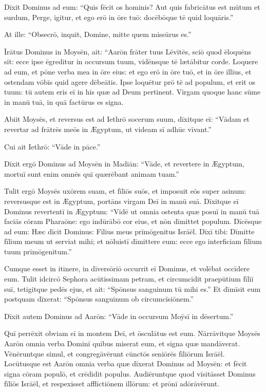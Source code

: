 Dīxit Dominus ad eum: ``Quis fēcit os hominis?
Aut quis fabricātus est mūtum et surdum,
Perge, igitur, et ego erō in ōre tuō:
docēbōque tē quid loquāris.''

At ille: ``Obsecrō, inquit, Domine,
mitte quem missūrus es.''

Īrātus Dominus in Moysēn, ait: ``Aarōn frāter tuus Lēvītēs,
sciō quod ēloquēns sit: ecce ipse ēgreditur in occursum tuum,
vidēnsque tē lætābitur corde.
Loquere ad eum, et pōne verba mea in ōre eius:
et ego erō in ōre tuō, et in ōre illīus,
et ostendam vōbīs quid agere dēbeātis.
Ipse loquētur prō tē ad populum,
et erit os tuum:
tū autem eris eī in hīs quæ ad Deum pertinent.
Virgam quoque hanc sūme in manū tuā,
in quā factūrus es signa.

Abiit Moysēs, et reversus est ad Iethrō socerum suum,
dīxitque eī: ``Vādam et revertar ad frātrēs meōs in Ægyptum,
ut videam sī adhūc vīvant.''

Cui ait Iethrō: ``Vāde in pāce.''

Dīxit ergō Dominus ad Moysēn in Madiān: ``Vāde, et revertere in Ægyptum,
mortuī sunt enim omnēs quī quærēbant animam tuam.''

Tulit ergō Moysēs uxōrem suam, et fīliōs suōs,
et imposuit eōs super asinum: reversusque est in Ægyptum,
portāns virgam Deī in manū suā. Dīxitque eī Dominus revertentī
in Ægyptum: ``Vidē ut omnia ostenta quæ posuī in manū tuā
faciās cōram Pharaōne: ego indūrābō cor eius,
et nōn dīmittet populum. Dīcēsque ad eum: Hæc
dīcit Dominus: Fīlius meus prīmōgenitus Isrāēl.
Dīxī tibi: Dīmitte fīlium meum ut serviat mihi;
et nōluistī dīmittere eum:
ecce ego interficiam fīlium tuum prīmōgenitum.''

Cumque esset in itinere, in dīversōriō
occurrit eī Dominus, et volēbat occīdere eum. 
Tulit idcircō Sephora acūtissimam petram,
et circumcīdit praepūtium fīliī suī, tetigitque pedēs ejus,
et ait: ``Spōnsus sanguinum tū mihi es.''
Et dīmīsit eum postquam dīxerat: ``Spōnsus sanguinum ob circumcīsiōnem.''

Dīxit autem Dominus ad Aarōn: ``Vāde in occursum Moȳsī
in dēsertum.'' 

Quī perrēxit obviam eī in montem Deī, et ōsculātus est eum.
Nārrāvitque Moysēs Aarōn omnia verba Dominī quibus miserat eum,
et signa quæ mandāverat. Vēnēruntque simul, et congregāvērunt
cūnctōs seniōrēs fīliōrum Isrāēl.
Locūtusque est Aarōn omnia verba quæ dīxerat Dominus ad Moysēn: et
fēcit signa cōram populō, et crēdidit populus.
Audiēruntque quod vīsitāsset Dominus fīliōs Isrāēl,
et respexisset afflīctiōnem illōrum: et prōnī adōrāvērunt.
